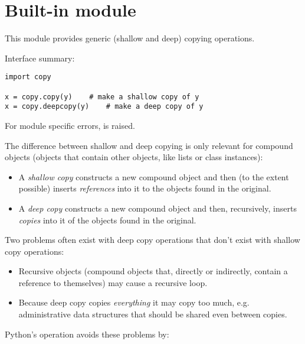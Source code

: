 \section{Built-in module }

This module provides generic (shallow and deep) copying operations.

Interface summary:

\begin{verbatim}
import copy

x = copy.copy(y)	# make a shallow copy of y
x = copy.deepcopy(y)	# make a deep copy of y
\end{verbatim}

For module specific errors,  is raised.

The difference between shallow and deep copying is only relevant for
compound objects (objects that contain other objects, like lists or
class instances):

\begin{itemize}

\item
A {\em shallow copy} constructs a new compound object and then (to the
extent possible) inserts {\em references} into it to the objects found
in the original.

\item
A {\em deep copy} constructs a new compound object and then,
recursively, inserts {\em copies} into it of the objects found in the
original.

\end{itemize}

Two problems often exist with deep copy operations that don't exist
with shallow copy operations:

\begin{itemize}

\item
Recursive objects (compound objects that, directly or indirectly,
contain a reference to themselves) may cause a recursive loop.

\item
Because deep copy copies {\em everything} it may copy too much, e.g.
administrative data structures that should be shared even between
copies.

\end{itemize}

Python's  operation avoids these problems by:

